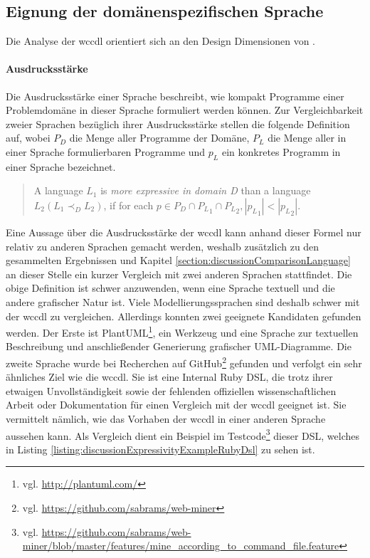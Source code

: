 \subsection{Eignung der domänenspezifischen Sprache}
    \label{section:discussionInterpretationLanguage}
    Die Analyse der \gls{wccdl} orientiert sich
    an den Design Dimensionen von \cite{voelter:DslEngineering}.

    \paragraph{Ausdrucksstärke}
    Die Ausdrucksstärke einer Sprache beschreibt,
    wie kompakt Programme einer Problemdomäne in dieser Sprache
    formuliert werden können.
    Zur Vergleichbarkeit zweier Sprachen bezüglich ihrer Ausdrucksstärke
    stellen \citet[Kapitel 4.1]{voelter:DslEngineering} die folgende
    Definition auf, wobei
    $P_D$ die Menge aller Programme der Domäne,
    $P_L$ die Menge aller in einer Sprache formulierbaren Programme und
    $p_L$ ein konkretes Programm in einer Sprache bezeichnet.

    \begin{quote}
        A language $L_1$ is \textit{more expressive in domain D}
        than a language $L_2 (L_1 {\prec}_D L_2)$,
        if for each $p \in P_D \cap {P_L}_1 \cap {P_L}_2, |{p_L}_1| < |{p_L}_2|$.
    \end{quote}

    Eine Aussage über die Ausdrucksstärke der \gls{wccdl} kann anhand dieser Formel
    nur relativ zu anderen Sprachen gemacht werden,
    weshalb zusätzlich zu den gesammelten Ergebnissen und
    Kapitel \ref{section:discussionComparisonLanguage}
    an dieser Stelle ein kurzer Vergleich mit zwei anderen Sprachen stattfindet.
    Die obige Definition ist schwer anzuwenden,
    wenn eine Sprache textuell und die andere grafischer Natur ist.
    Viele Modellierungssprachen sind deshalb schwer mit der \gls{wccdl} zu vergleichen.
    Allerdings konnten zwei geeignete Kandidaten gefunden werden.
    Der Erste ist PlantUML\footnote{vgl. \url{http://plantuml.com/}},
    ein Werkzeug und eine Sprache zur textuellen Beschreibung und anschließender
    Generierung grafischer UML-Diagramme.
    Die zweite Sprache wurde bei Recherchen auf
    GitHub\footnote{vgl. \url{https://github.com/sabrams/web-miner}} gefunden
    und verfolgt ein sehr ähnliches Ziel wie die \gls{wccdl}.
    Sie ist eine Internal Ruby DSL, die trotz ihrer etwaigen Unvollständigkeit sowie der fehlenden
    offiziellen wissenschaftlichen Arbeit oder Dokumentation
    für einen Vergleich mit der \gls{wccdl} geeignet ist.
    Sie vermittelt nämlich, wie das Vorhaben der \gls{wccdl}
    in einer anderen Sprache aussehen kann.
    Als Vergleich dient ein Beispiel im
    Testcode\footnote{vgl. \url{https://github.com/sabrams/web-miner/blob/master/features/mine_according_to_command_file.feature}}
    dieser DSL, welches in Listing \ref{listing:discussionExpressivityExampleRubyDsl}
    zu sehen ist.

